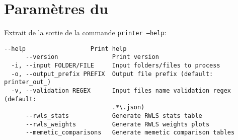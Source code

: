 \documentclass[a4paper,11pt,twoside,french,report]{../common/simplem}
\begin{document}
		\newpage\section{Paramètres du \printer{}}\label{sec:printer_parameters}
			Extrait de la sortie de la commande \texttt{printer --help}:
			\begin{Verbatim}[frame=single]
      --help                  Print help
      --version               Print version
  -i, --input FOLDER/FILE     Input folders/files to process
  -o, --output_prefix PREFIX  Output file prefix (default: printer_out_)
  -v, --validation REGEX      Input files name validation regex (default:
                              .*\.json)
      --rwls_stats            Generate RWLS stats table
      --rwls_weights          Generate RWLS weights plots
      --memetic_comparisons   Generate memetic comparison tables
			\end{Verbatim}
	\makeutbmbackcover{}
\end{document}
